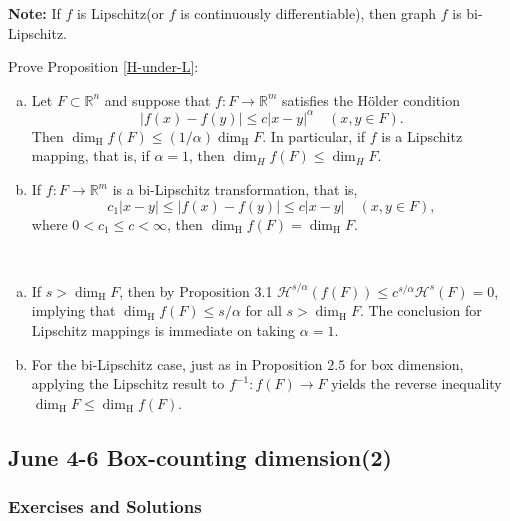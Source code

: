 \textbf{Note: }If $f$ is Lipschitz(or $f$ is continuously differentiable), then graph $f$ is bi-Lipschitz. 


\begin{customexercise}{}
    Prove Proposition \ref{H-under-L}:
    \begin{enumerate}[(a)]
        \item Let $F \subset \mathbb{R}^{n}$ and suppose that $f: F \rightarrow \mathbb{R}^{m}$ satisfies the Hölder condition
$$
|f(x)-f(y)| \leq c|x-y|^{\alpha} \quad(x, y \in F) .
$$
Then $\operatorname{dim}_{\mathrm{H}} f(F) \leq(1 / \alpha) \operatorname{dim}_{\mathrm{H}} F .$ In particular, if $f$ is a Lipschitz
mapping, that is, if $\alpha=1$, then $\operatorname{dim}_{H} f(F) \leq \operatorname{dim}_{H} F$.
\item If $f: F \rightarrow \mathbb{R}^{m}$ is a bi-Lipschitz transformation, that is,
$$
c_{1}|x-y| \leq|f(x)-f(y)| \leq c|x-y| \quad(x, y \in F),
$$
where $0<c_{1} \leq c<\infty$, then $\operatorname{dim}_{\mathrm{H}} f(F)=\operatorname{dim}_{\mathrm{H}} F$.
    \end{enumerate}
\end{customexercise}

\begin{customsol}{} $ $
    \begin{enumerate}[(a)]
        \item If $s>\operatorname{dim}_{\mathrm{H}} F$, then by Proposition 3.1 $\mathcal{H}^{s / \alpha}(f(F)) \leq c^{s / \alpha} \mathcal{H}^{s}(F)=0$,
        implying that $\operatorname{dim}_{\mathrm{H}} f(F) \leq s / \alpha$ for all $s>\operatorname{dim}_{\mathrm{H}} F$. The conclusion for
        Lipschitz mappings is immediate on taking $\alpha=1$.
        \item For the bi-Lipschitz case, just as in Proposition $2.5$ for box dimension, applying the Lipschitz result to $f^{-1}: f(F) \rightarrow F$ yields the reverse inequality $\operatorname{dim}_{\mathrm{H}} F \leq \operatorname{dim}_{\mathrm{H}} f(F)$.
    \end{enumerate}
\end{customsol}

\newpage

\subsection{June 4-6 Box-counting dimension(2)}
\subsubsection{Exercises and Solutions}

